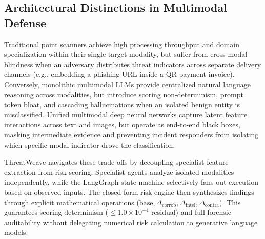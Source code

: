 \documentclass[conference]{IEEEtran}
\begin{document}
\subsection{Architectural Distinctions in Multimodal Defense}
Traditional point scanners \cite{xiang2011cantina, marchal2014phishstorm} achieve high processing throughput and domain specialization within their single target modality, but suffer from cross-modal blindness when an adversary distributes threat indicators across separate delivery channels (e.g., embedding a phishing URL inside a QR payment invoice). Conversely, monolithic multimodal LLMs \cite{wang2024surveyagents} provide centralized natural language reasoning across modalities, but introduce scoring non-determinism, prompt token bloat, and cascading hallucinations when an isolated benign entity is misclassified. Unified multimodal deep neural networks \cite{abdelnabi2020visualphishnet} capture latent feature interactions across text and images, but operate as end-to-end black boxes, masking intermediate evidence and preventing incident responders from isolating which specific modal indicator drove the classification.

ThreatWeave navigates these trade-offs by decoupling specialist feature extraction from risk scoring. Specialist agents analyze isolated modalities independently, while the LangGraph state machine selectively fans out execution based on observed inputs. The closed-form risk engine then synthesizes findings through explicit mathematical operations ($\text{base}, \Delta_{\text{corrob}}, \Delta_{\text{intel}}, \Delta_{\text{contra}}$). This guarantees scoring determinism ($\le 1.0 \times 10^{-4}$ residual) and full forensic auditability without delegating numerical risk calculation to generative language models.
\end{document}
